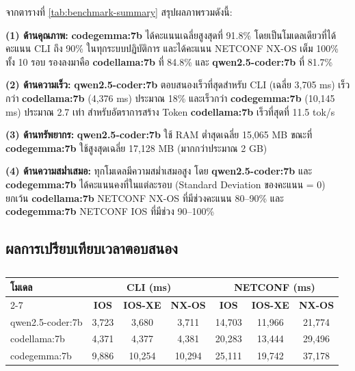 \hspace*{1.3em}
จากตารางที่ \ref{tab:benchmark-summary} สรุปผลภาพรวมดังนี้:

\hspace*{1.3em}
\textbf{(1) ด้านคุณภาพ:} \textbf{codegemma:7b} ได้คะแนนเฉลี่ยสูงสุดที่ 91.8\% โดยเป็นโมเดลเดียวที่ได้คะแนน CLI ถึง 90\% ในทุกระบบปฏิบัติการ และได้คะแนน NETCONF NX-OS เต็ม 100\% ทั้ง 10 รอบ รองลงมาคือ \textbf{codellama:7b} ที่ 84.8\% และ \textbf{qwen2.5-coder:7b} ที่ 81.7\%

\hspace*{1.3em}
\textbf{(2) ด้านความเร็ว:} \textbf{qwen2.5-coder:7b} ตอบสนองเร็วที่สุดสำหรับ CLI (เฉลี่ย 3,705 ms) เร็วกว่า \textbf{codellama:7b} (4,376 ms) ประมาณ 18\% และเร็วกว่า \textbf{codegemma:7b} (10,145 ms) ประมาณ 2.7 เท่า สำหรับอัตราการสร้าง Token \textbf{codellama:7b} เร็วที่สุดที่ 11.5 tok/s

\hspace*{1.3em}
\textbf{(3) ด้านทรัพยากร:} \textbf{qwen2.5-coder:7b} ใช้ RAM ต่ำสุดเฉลี่ย 15,065 MB ขณะที่ \textbf{codegemma:7b} ใช้สูงสุดเฉลี่ย 17,128 MB (มากกว่าประมาณ 2 GB)

\hspace*{1.3em}
\textbf{(4) ด้านความสม่ำเสมอ:} ทุกโมเดลมีความสม่ำเสมอสูง โดย \textbf{qwen2.5-coder:7b} และ \textbf{codegemma:7b} ได้คะแนนคงที่ในแต่ละรอบ (Standard Deviation ของคะแนน = 0) ยกเว้น \textbf{codellama:7b} NETCONF NX-OS ที่มีช่วงคะแนน 80--90\% และ \textbf{codegemma:7b} NETCONF IOS ที่มีช่วง 90--100\%

\subsection{ผลการเปรียบเทียบเวลาตอบสนอง}

\begin{table}[H]
    \caption{}
    \label{tab:benchmark-time}
    \fontSixTeen
    \centering
    \begin{tabularx}{\textwidth}{|l|c|c|c|c|c|c|}
        \hline
        \textbf{โมเดล} & \multicolumn{3}{c|}{\textbf{CLI (ms)}} & \multicolumn{3}{c|}{\textbf{NETCONF (ms)}} \\
        \cline{2-7}
        & \textbf{IOS} & \textbf{IOS-XE} & \textbf{NX-OS} & \textbf{IOS} & \textbf{IOS-XE} & \textbf{NX-OS} \\
        \hline
        qwen2.5-coder:7b & 3,723 & 3,680 & 3,711 & 14,703 & 11,966 & 21,774 \\
        \hline
        codellama:7b & 4,371 & 4,377 & 4,381 & 20,283 & 13,444 & 29,496 \\
        \hline
        codegemma:7b & 9,886 & 10,254 & 10,294 & 25,111 & 19,742 & 37,178 \\
        \hline
    \end{tabularx}
\end{table}

